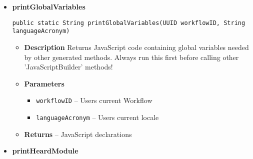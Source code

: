 \documentclass[11pt,a4paper]{report}
\begin{document}
{{{{{{{{{{{{{{{\begin{itemize}
{						\hypertarget{studyplanning.view.JavaScriptBuilder.printGenerationCall()}{{\bf  printGenerationCall}\\}
						\begin{lstlisting}[frame=none]
public static String printGenerationCall()
						\end{lstlisting} %
						\begin{itemize}
							\item{
								{\bf  Description}
								Returns a JavaScript method that calls 'ViewBuilder' to process a new Workflow with given preferences. Please add 'onclick = "generateWorkflow('preferences')"' to your HTML to activate this generated method.
							}
							\item{
								{\bf  Returns} -- JavaScript event method 
							}%
						\end{itemize}
					}%
					\item{ 
						\hypertarget{studyplanning.view.JavaScriptBuilder.printGlobalVariables(java.util.UUID, java.lang.String)}{{\bf  printGlobalVariables}\\}
						\begin{lstlisting}[frame=none]
public static String printGlobalVariables(UUID workflowID, String languageAcronym)
						\end{lstlisting} %
						\begin{itemize}
							\item{
								{\bf  Description}
								Returns JavaScript code containing global variables needed by other generated methods. Always run this first before calling other 'JavaScriptBuilder' methods!
							}
							\item{
								{\bf  Parameters}
								\begin{itemize}
									\item{\texttt{workflowID} -- Users current Workflow}
									\item{\texttt{languageAcronym} -- Users current locale}
								\end{itemize}
							}%
							\item{
								{\bf  Returns} -- JavaScript declarations 
							}%
						\end{itemize}
					}%
					\item{
						\hypertarget{studyplanning.view.JavaScriptBuilder.printHeardModule()}{{\bf  printHeardModule}\\}
}
\end{itemize}}}}}}}}}}}}}}}}
\end{document}
